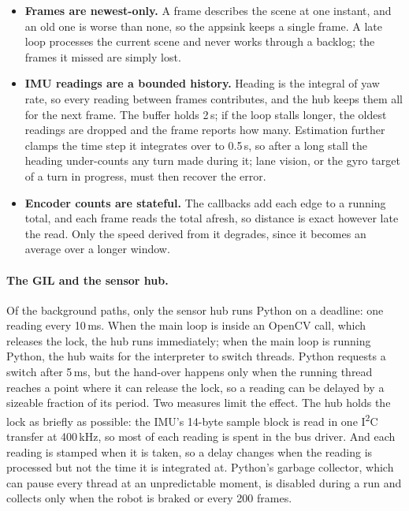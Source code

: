 \begin{itemize}
      \item \textbf{Frames are newest-only.} A frame describes the scene at one
            instant, and an old one is worse than none, so the appsink keeps a
            single frame. A late loop processes the current scene and never
            works through a backlog; the frames it missed are simply lost.
      \item \textbf{IMU readings are a bounded history.} Heading is the
            integral of yaw rate, so every reading between frames contributes,
            and the hub keeps them all for the next frame. The buffer holds
            2\,s; if the loop stalls longer, the oldest readings are dropped
            and the frame reports how many. Estimation further clamps the time
            step it integrates over to 0.5\,s, so after a long stall the
            heading under-counts any turn made during it; lane vision, or the
            gyro target of a turn in progress, must then recover the error.
      \item \textbf{Encoder counts are stateful.} The callbacks add
            each edge to a running total, and each frame reads the total
            afresh, so distance is exact however late the read. Only the speed
            derived from it degrades, since it becomes an average over a longer
            window.
\end{itemize}

\paragraph{The GIL and the sensor hub.}
Of the background paths, only the sensor hub runs Python on a deadline: one
reading every 10\,ms. When the main loop is inside an OpenCV call, which
releases the lock, the hub runs immediately; when the main loop is running
Python, the hub waits for the interpreter to switch threads. Python requests a
switch after 5\,ms, but the hand-over happens only when the running thread
reaches a point where it can release the lock, so a reading can be delayed by a
sizeable fraction of its period. Two measures limit the effect. The hub holds
the lock as briefly as possible: the IMU's 14-byte sample block is read in one
I\textsuperscript{2}C transfer at 400\,kHz, so most of each reading is spent in
the bus driver. And each reading is stamped when it is taken, so a delay
changes when the reading is processed but not the time it is integrated at.
Python's garbage collector, which can pause every thread at an unpredictable
moment, is disabled during a run and collects only when the robot is braked or
every 200 frames.


